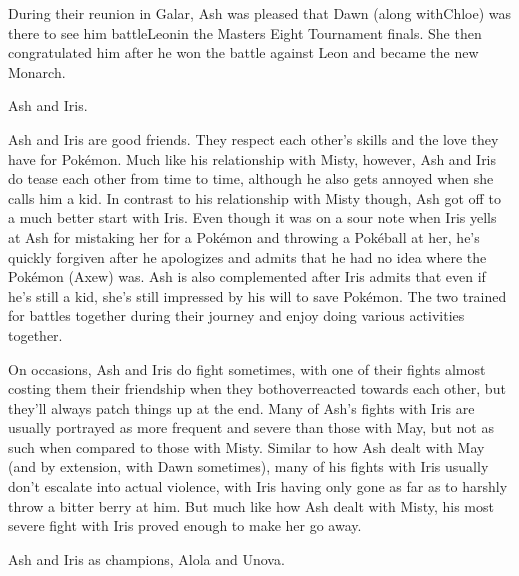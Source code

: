 \documentclass[a4paper,12pt]{article}
\begin{document}
During their reunion in Galar, Ash was pleased that Dawn (along withChloe) was there to see him battleLeonin the Masters Eight Tournament finals. She then congratulated him after he won the battle against Leon and became the new Monarch.\\ \par \vspace{0.5cm}

Ash and Iris.\\ \par \vspace{0.5cm}

Ash and Iris are good friends. They respect each other's skills and the love they have for Pokémon. Much like his relationship with Misty, however, Ash and Iris do tease each other from time to time, although he also gets annoyed when she calls him a kid. In contrast to his relationship with Misty though, Ash got off to a much better start with Iris. Even though it was on a sour note when Iris yells at Ash for mistaking her for a Pokémon and throwing a Pokéball at her, he's quickly forgiven after he apologizes and admits that he had no idea where the Pokémon (Axew) was. Ash is also complemented after Iris admits that even if he's still a kid, she's still impressed by his will to save Pokémon. The two trained for battles together during their journey and enjoy doing various activities together.\\ \par \vspace{0.5cm}

On occasions, Ash and Iris do fight sometimes, with one of their fights almost costing them their friendship when they bothoverreacted towards each other, but they'll always patch things up at the end. Many of Ash's fights with Iris are usually portrayed as more frequent and severe than those with May, but not as such when compared to those with Misty. Similar to how Ash dealt with May (and by extension, with Dawn sometimes), many of his fights with Iris usually don't escalate into actual violence, with Iris having only gone as far as to harshly throw a bitter berry at him. But much like how Ash dealt with Misty, his most severe fight with Iris proved enough to make her go away.\\ \par \vspace{0.5cm}

Ash and Iris as champions, Alola and Unova.\\ \par \vspace{0.5cm}
\end{document}
